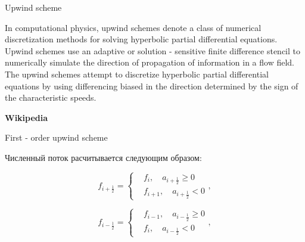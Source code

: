 \documentclass[10pt,xcolor=pst,aspectratio=169]{beamer}
\begin{document}
\begin{frame}{Upwind scheme}

	\transdissolve[duration=0.1]
	\justifying
	\large

	In computational physics, upwind schemes denote a class of numerical discretization methods for solving hyperbolic partial differential equations. Upwind schemes use an adaptive or solution - sensitive finite difference stencil to numerically simulate the direction of propagation of information in a flow field. The upwind schemes attempt to discretize hyperbolic partial differential equations by using differencing biased in the direction determined by the sign of the characteristic speeds.

	\begin{flushright}
		\textbf{Wikipedia}
	\end{flushright}

\end{frame}

\begin{frame}{First - order upwind scheme}

	\transdissolve[duration=0.1]
	\justifying
	\large

	Численный поток расчитывается следующим образом:

	\[
		f_{i + \frac{1}{2}} =
			\begin{cases}
				&f_{i}, \quad a_{i + \frac{1}{2}} \geq 0 \\
				&f_{i + 1}, \quad a_{i + \frac{1}{2}} < 0
			\end{cases},
	\]

	\[
		f_{i - \frac{1}{2}} =
			\begin{cases}
				&f_{i - 1}, \quad a_{i - \frac{1}{2}} \geq 0 \\
				&f_{i}, \quad a_{i - \frac{1}{2}} < 0
			\end{cases},
	\]

\end{frame}
\end{document}
